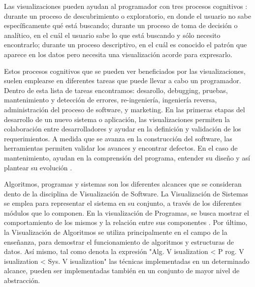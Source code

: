 Las visualizaciones pueden ayudan al programador con tres procesos cognitivos
\cite{ButlerAlmond93}:
durante un proceso de descubrimiento o exploratorio, en donde el usuario no
sabe específicamente qué está buscando;
durante un proceso de toma de decisión o analítico, en el cuál el usuario sabe lo que
está buscando y sólo necesito encontrarlo;
durante un proceso descriptivo, en el cuál es conocido el patrón que aparece en los
datos pero necesita una visualización acorde para expresarlo.

Estos procesos cognitivos que se pueden ver beneficiados por las visualizaciones, suelen
emplearse en diferentes tareas que puede llevar a cabo un programador.
Dentro de esta lista de tareas \cite{MalleticMarcusCollard02} encontramos: desarollo,
debugging, pruebas, mantenimiento y detección de errores, re-ingeniería, ingeniería reversa,
administración del proceso de software, y marketing.
En las primeras etapas del desarrollo de un nuevo sistema o aplicación, las visualizaciones
permiten la colaboración entre desarrolladores y ayudar en la definición y validación de los
requerimientos.
A medida que se avanza en la construcción del software, las herramientas permiten validar
los avances y encontrar defectos.
En el caso de mantenimiento, ayudan en la comprensión del programa, entender su diseño y
así plantear su evolución \cite{PetreDeQuincey06}.

Algoritmos, programas y sistemas son los diferentes alcances que se consideran
dento de la disciplina de Visualización de Software.\cite{PriceBaeckerSmall93,Myers90}
La Visualización de Sistemas se emplea para representar el sistema en su conjunto,
a través de los diferentes módulos que lo componen.
En la visualización de Programas, se busca mostrar el comportamiento de los mismos
y la relación entre sus componentes \cite{BenAri01}.
Por último, la Visualización de Algoritmos se utiliza principalmente en el campo de la enseñanza,
para demostrar el funcionamiento de algoritmos y estructuras de datos.
Así mismo, tal como denota la expresión 
"Alg. V isualization < P rog. V isualization < Sys. V isualization"\cite{BeronHenriquesPereiraUzal07}
las técnicas implementadas en un determinado alcance, pueden ser implementadas
también en un conjunto de mayor nivel de abstracción.

